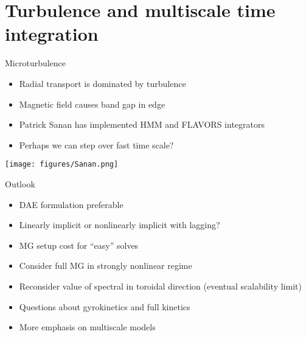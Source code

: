 \documentclass{beamer}
\begin{document}
\section{Turbulence and multiscale time integration}
\begin{frame}{Microturbulence}
  \begin{itemize}
  \item Radial transport is dominated by turbulence
  \item Magnetic field causes band gap in edge
  \item Patrick Sanan has implemented HMM and FLAVORS integrators
  \item Perhaps we can step over fast time scale?
  \end{itemize}
  \texttt{[image: figures/Sanan.png]}
\end{frame}

% 
% 
% 
% 

\begin{frame}{Outlook}
  \begin{itemize}
  \item DAE formulation preferable
  \item Linearly implicit or nonlinearly implicit with lagging?
  \item MG setup cost for ``easy'' solves
  \item Consider full MG in strongly nonlinear regime
  \item Reconsider value of spectral in toroidal direction (eventual scalability limit)
  \item Questions about gyrokinetics and full kinetics
  \item More emphasis on multiscale models
  \end{itemize}
\end{frame}
\end{document}
